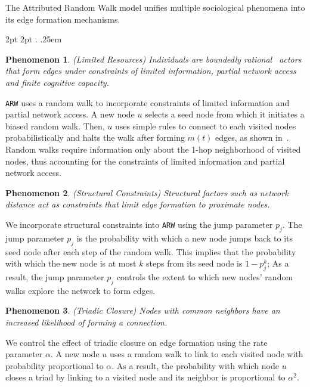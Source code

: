 The Attributed Random Walk model unifies multiple sociological phenomena
into its edge formation mechanisms.

  {2pt} %
  {2pt} %
  {\itshape} %
  {} %
  {\bfseries} %
  {.} %
  {.25em} %
  {} %

\theoremstyle{exampstyle} \newtheorem{ph}{Phenomenon}

\begin{ph}
	(Limited Resources) Individuals are boundedly rational~\cite{simon1972theories,gigerenzer1996reasoning,lipman1995information}
	actors that form edges under constraints of limited information, partial network access and finite cognitive capacity.
\end{ph}
\texttt{ARW} uses a random walk to incorporate constraints of limited information
and partial network access. A new node $u$ selects a seed node from which it
initiates a biased random walk. Then, $u$ uses simple rules to connect to each visited
nodes probabilistically and halts the walk after forming $m(t)$ edges, as shown in~. Random walks require information only about the
1-hop neighborhood of visited nodes, thus accounting for  the constraints of limited information and partial network access.

\begin{ph}
	(Structural Constraints) Structural factors such as network distance
	act as constraints that limit edge formation to proximate nodes.  \cite{35626}
\end{ph}

We incorporate structural constraints into \texttt{ARW} using the jump parameter $p_j$.
The jump parameter $p_j$ is the probability with which a new node jumps back to its seed node
after each step of the random walk. This implies that the probability with which the new node
is at most $k$ steps from its seed node is $1-p^k_j$; As a result, the jump parameter $p_j$
controls the extent to which new nodes' random walks explore the network to form edges.

\begin{ph}
	(Triadic Closure) Nodes with common neighbors have an
	increased likelihood of forming a connection. \cite{simmel1950sociology}
\end{ph}

We control the effect of triadic closure on edge formation using the
rate parameter $\alpha$. A new node $u$ uses a random walk to
link to each visited node with probability proportional to $\alpha$. As a
result, the probability with which node $u$ closes a triad by linking to
a visited node and its neighbor is proportional to $\alpha^2$.

